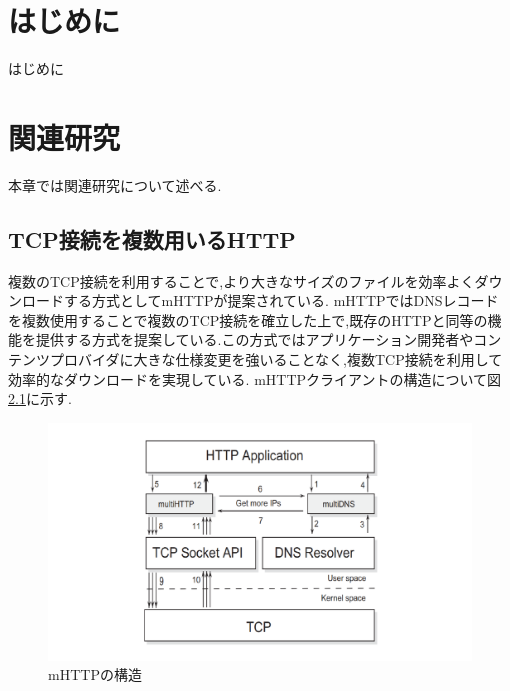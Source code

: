 \documentclass[a4j,12pt]{gradthesis_utf8}
\begin{document}
 
\maketitle %

\chapter{はじめに}\label{sec:sec1}
はじめに
\chapter{関連研究}\label{sec:sec2}
本章では関連研究について述べる.

\section{TCP接続を複数用いるHTTP}
複数のTCP接続を利用することで,より大きなサイズのファイルを効率よくダウンロードする方式としてmHTTP\cite{mhttp}が提案されている.
mHTTPではDNSレコードを複数使用することで複数のTCP接続を確立した上で,既存のHTTPと同等の機能を提供する方式を提案している.この方式ではアプリケーション開発者やコンテンツプロバイダに大きな仕様変更を強いることなく,複数TCP接続を利用して効率的なダウンロードを実現している.
mHTTPクライアントの構造について図\ref{mhttp}に示す.

\begin{figure}[ht]
	\centering
	\includegraphics[width=16cm]{figure/mhttp.pdf}
	\caption{mHTTPの構造}
	\label{mhttp}
\end{figure}
\end{document}
